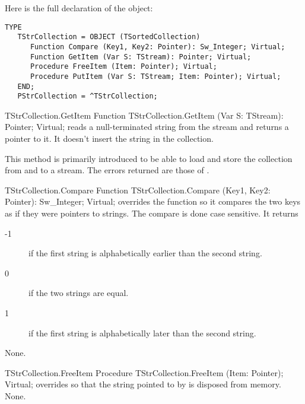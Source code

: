 Here is the full declaration of the  object:

\begin{verbatim}
TYPE
   TStrCollection = OBJECT (TSortedCollection)
      Function Compare (Key1, Key2: Pointer): Sw_Integer; Virtual;
      Function GetItem (Var S: TStream): Pointer; Virtual;
      Procedure FreeItem (Item: Pointer); Virtual;
      Procedure PutItem (Var S: TStream; Item: Pointer); Virtual;
   END;
   PStrCollection = ^TStrCollection;
\end{verbatim}

\begin{function}{TStrCollection.GetItem}
\Declaration
Function TStrCollection.GetItem (Var S: TStream): Pointer; Virtual;
\Description
{} reads a null-terminated string from the stream  
and returns a pointer  to it. It doesn't insert the string in the 
collection.

This method is primarily introduced to be able to load and store the
collection from and to a stream.
\Errors
The errors returned are those of .
\SeeAlso
{}
\end{function}

\begin{function}{TStrCollection.Compare}
\Declaration
Function TStrCollection.Compare (Key1, Key2: Pointer): Sw\_Integer; Virtual;
\Description
{} overrides the  function so it compares 
the two keys as if they were pointers to strings. The compare is done case
sensitive. It returns
\begin{description}
\item[-1] if the first string is alphabetically earlier  than the second
string.
\item[0] if the two strings are equal.
\item[1] if the first string is alphabetically later than the second string.
\end{description}
\Errors
None.
\SeeAlso
{}
\end{function}

\begin{procedure}{TStrCollection.FreeItem}
\Declaration
Procedure TStrCollection.FreeItem (Item: Pointer); Virtual;
\Description
{} overrides  so that the string pointed
to by  is disposed from memory.
\Errors
None.
\SeeAlso
{}
\end{procedure}

